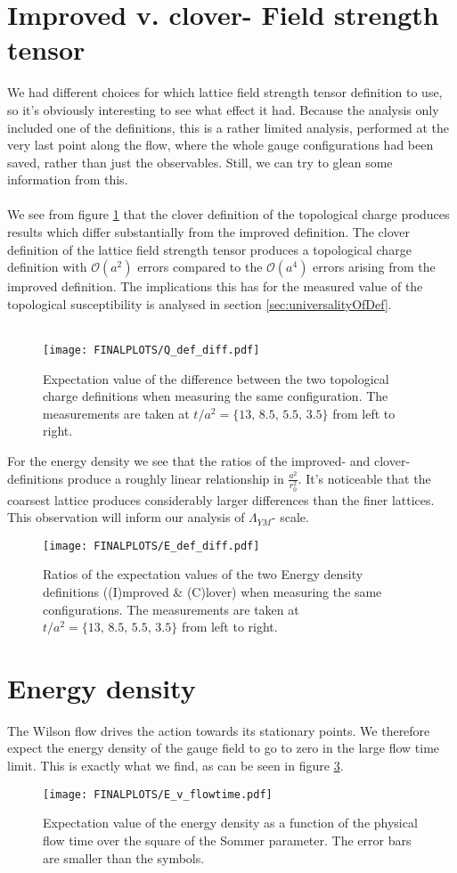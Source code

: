 \documentclass[a4paper,10pt]{book}
\begin{document}
\section{Improved v. clover- Field strength tensor}
We had different choices for which lattice field strength tensor definition to use, so it's obviously interesting to see what effect it had. Because the analysis only included one of the definitions, this is a rather limited analysis, performed at the very last point along the flow, where the whole gauge configurations had been saved, rather than just the observables. Still, we can try to glean some information from this.\\\\We see from figure \ref{fig:Q_FST_defs_diff} that the clover definition of the topological charge produces results which differ substantially from the improved definition. The clover definition of the lattice field strength tensor produces a topological charge definition with $\mathcal{O}(a^2)$ errors compared to the $\mathcal{O}(a^4)$ errors arising from the improved definition. The implications this has for the measured value of the topological susceptibility is analysed in section \ref{sec:universalityOfDef}.\\\\
\begin{figure}[htbp]
\centering
\texttt{[image: FINALPLOTS/Q\_def\_diff.pdf]}
\caption[]{Expectation value of the difference between the two topological charge definitions when measuring the same configuration. The measurements are taken at $t/a^2 = \{13,\,8.5,\,5.5,\,3.5 \}$ from left to right.}\label{fig:Q_FST_defs_diff}
\end{figure}
For the energy density we see that the ratios of the improved- and clover- definitions produce a roughly linear relationship in $\frac{a^2}{r_0^2}$.  It's noticeable that the coarsest lattice produces considerably larger differences than the finer lattices. This observation will inform our analysis of $\Lambda_{YM}$- scale.
\begin{figure}[htbp]
\centering
\texttt{[image: FINALPLOTS/E\_def\_diff.pdf]}
\caption[]{Ratios of the expectation values of the two Energy density definitions ((I)mproved \& (C)lover) when measuring the same configurations. The measurements are taken at $t/a^2 = \{13,\,8.5,\,5.5,\,3.5 \}$ from left to right.}\label{fig:E_FST_defs_diff}
\end{figure}
\FloatBarrier
\section{Energy density}
The Wilson flow drives the action towards its stationary points. We therefore expect the energy density of the gauge field to go to zero in the large flow time limit. This is exactly what we find, as can be seen in figure \ref{fig:EvFlow}. 
\begin{figure}[htbp]
\centering
\texttt{[image: FINALPLOTS/E\_v\_flowtime.pdf]}
\caption[]{Expectation value of the energy density as a function of the physical flow time over the square of the Sommer parameter. The error bars are smaller than the symbols. }\label{fig:EvFlow}
\end{figure}
\end{document}
